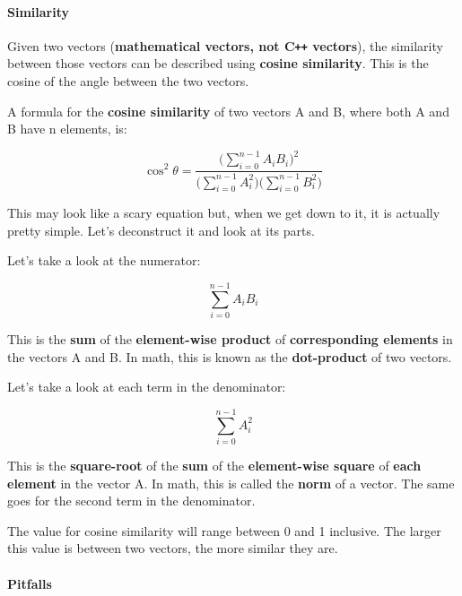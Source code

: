 \documentclass[]{article}
\let\oldparagraph\paragraph
\renewcommand{\paragraph}[1]{\oldparagraph{#1}\mbox{}}
\begin{document}
\paragraph{Similarity}\label{similarity}

Given two vectors (\textbf{mathematical vectors, not C\texttt{++} vectors}), the
similarity between those vectors can be described using \textbf{cosine
similarity}. This is the cosine of the angle between the two vectors.

A formula for the \textbf{cosine similarity} of two vectors A and B,
where both A and B have n elements, is:

\begin{equation}
\cos^2 \theta = \frac{\Big(\sum\limits_{i=0}^{n-1}{A_i B_i}\Big)^2}{\Big(\sum\limits_{i=0}^{n-1}{A_i^2}\Big) \Big(\sum\limits_{i=0}^{n-1}{B_i^2}\Big)}
\end{equation}

This may look like a scary equation but, when we get down to it, it is
actually pretty simple. Let's deconstruct it and look at its parts.

Let's take a look at the numerator:

\begin{equation}
\sum\limits_{i=0}^{n-1}{A_i B_i}
\end{equation}

This is the \textbf{sum} of the \textbf{element-wise product} of
\textbf{corresponding elements} in the vectors A and B. In math, this is
known as the \textbf{dot-product} of two vectors.

Let's take a look at each term in the denominator:

\begin{equation}
\sum\limits_{i=0}^{n-1}{A_i^2}
\end{equation}

This is the \textbf{square-root} of the \textbf{sum} of the
\textbf{element-wise square} of \textbf{each element} in the vector A.
In math, this is called the \textbf{norm} of a vector. The same goes for
the second term in the denominator.

The value for cosine similarity will range between 0 and 1 inclusive.
The larger this value is between two vectors, the more similar they are.

\paragraph{Pitfalls}\label{pitfalls}
\end{document}
